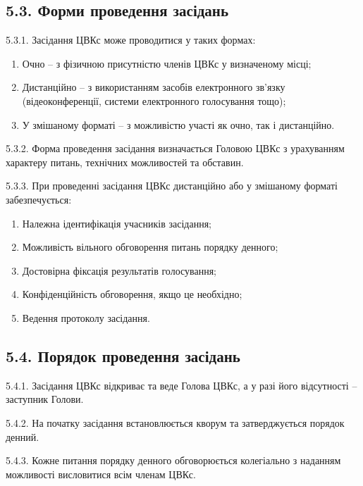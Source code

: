\subsection*{5.3. Форми проведення засідань}
    5.3.1. Засідання ЦВКс може проводитися у таких формах:

        \begin{enumerate}[label=\alph*)]
            \item Очно -- з фізичною присутністю членів ЦВКс у визначеному місці;
            \item Дистанційно -- з використанням засобів електронного зв'язку (відеоконференції, системи електронного голосування тощо);
            \item У змішаному форматі -- з можливістю участі як очно, так і дистанційно.
        \end{enumerate}

    5.3.2. Форма проведення засідання визначається Головою ЦВКс з урахуванням характеру питань, технічних можливостей та обставин.

    5.3.3. При проведенні засідання ЦВКс дистанційно або у змішаному форматі забезпечується:

        \begin{enumerate}[label=\alph*)]
            \item Належна ідентифікація учасників засідання;
            \item Можливість вільного обговорення питань порядку денного;
            \item Достовірна фіксація результатів голосування;
            \item Конфіденційність обговорення, якщо це необхідно;
            \item Ведення протоколу засідання.
        \end{enumerate}

\subsection*{5.4. Порядок проведення засідань}
    5.4.1. Засідання ЦВКс відкриває та веде Голова ЦВКс, а у разі його відсутності -- заступник Голови.

    5.4.2. На початку засідання встановлюється кворум та затверджується порядок денний.

    5.4.3. Кожне питання порядку денного обговорюється колегіально з наданням можливості висловитися всім членам ЦВКс.


